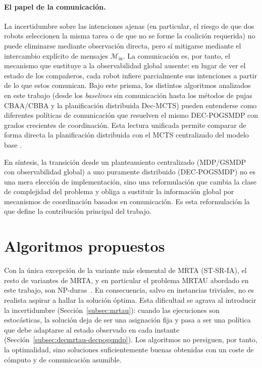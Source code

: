 \paragraph{El papel de la comunicación.} La incertidumbre sobre las intenciones ajenas (en particular, el riesgo de que dos robots seleccionen la misma tarea o de que no se forme la coalición requerida) no puede eliminarse mediante observación directa, pero sí mitigarse mediante el intercambio explícito de mensajes $\mathcal{M}_{\mathrm{in}}$. La comunicación es, por tanto, el mecanismo que sustituye a la observabilidad global ausente: en lugar de ver el estado de los compañeros, cada robot infiere parcialmente sus intenciones a partir de lo que estos comunican. Bajo este prisma, los distintos algoritmos analizados en este trabajo (desde los \textit{baselines} sin comunicación hasta los métodos de pujas CBAA/CBBA y la planificación distribuida Dec-MCTS) pueden entenderse como diferentes políticas de comunicación que resuelven el mismo DEC-POGSMDP con grados crecientes de coordinación. Esta lectura unificada permite comparar de forma directa la planificación distribuida con el MCTS centralizado del modelo base .
 
En síntesis, la transición desde un planteamiento centralizado (MDP/GSMDP con observabilidad global) a uno puramente distribuido (DEC-POGSMDP) no es una mera elección de implementación, sino una reformulación que cambia la clase de complejidad del problema y obliga a sustituir la información global por mecanismos de coordinación basados en comunicación. Es esta reformulación la que define la contribución principal del trabajo.


\section{Algoritmos propuestos} \label{sec:algoritmos}

Con la única excepción de la variante más elemental de MRTA (ST-SR-IA), el resto de variantes de MRTA, y en particular el problema MRTAU abordado en este trabajo, son NP-duras~\cite{gerkey2004taxonomy}. En consecuencia, salvo en instancias triviales, no es realista aspirar a hallar la solución óptima. Esta dificultad se agrava al introducir la incertidumbre (Sección~\ref{subsec:mrtau}): cuando las ejecuciones son estocásticas, la solución deja de ser una asignación fija y pasa a ser una política que debe adaptarse al estado observado en cada instante (Sección~\ref{subsec:decmrtau-decpogsmdp}). Los algoritmos no persiguen, por tanto, la optimalidad, sino soluciones suficientemente buenas obtenidas con un coste de cómputo y de comunicación asumible.
 
